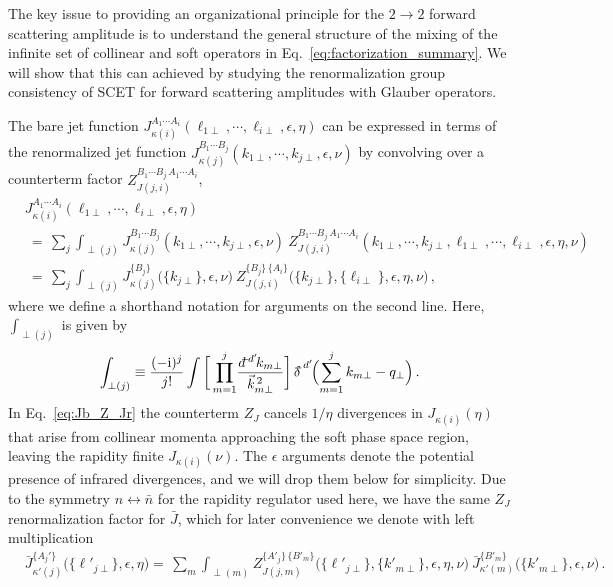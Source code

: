 \documentclass[letterpaper,11pt]{article}
\newcommand{\eq}[1]{Eq.~\eqref{eq:#1}}
\newcommand{\img}{\mathrm{i}}
\newcommand{\ddslash}{{d\!\!{}^-}}
\newcommand{\deltaslash}{{\delta\!\!\!{}^-}}
\newcommand{\nn}{\nonumber}
\newcommand{\bn}{{\bar n}}
\begin{document}
The key issue to providing an organizational principle for the  $2\to 2$ forward scattering amplitude is to understand the general structure of the mixing of the infinite set of collinear and soft operators in \eq{factorization_summary}. We will show that this can achieved by studying the renormalization group consistency of SCET for forward scattering amplitudes with Glauber operators.

The bare jet function $J_{\kappa(i)}^{A_1 \cdots A_i}(\ell_{1\perp}, \cdots, \ell_{i\perp},\epsilon,\eta)$ can be expressed in terms of the renormalized jet function $J_{\kappa(j)}^{B_1 \cdots B_j}(k_{1\perp},\cdots,k_{j\perp},\epsilon,\nu)$ by convolving over a counterterm factor  $Z_{J(j,i)}^{B_1\cdots B_j\, A_1\cdots A_i}$,
\begin{align}\label{eq:Jb_Z_Jr}
  & J_{\kappa(i)}^{A_1 \cdots A_i}(\ell_{1\perp}, \cdots, \ell_{i\perp},\epsilon,\eta)
  \\
   &\ =\, \sum_j \int_{\perp(j)}
  J_{\kappa(j)}^{B_1 \cdots B_j}(k_{1\perp},\cdots, k_{j\perp},\epsilon,\nu) \:
  Z_{J(j,i)}^{B_1\cdots B_j\, A_1\cdots A_i} ( k_{1\perp},\cdots, k_{j\perp},\ell_{1\perp},\cdots,\ell_{i\perp},\epsilon,\eta,\nu) 
 \nn\\
 &\ =\, \sum_j \int_{\perp(j)}
  J_{\kappa(j)}^{\{B_j\}}\bigl(\{k_{j\perp}\},\epsilon,\nu\bigr) \:
  Z_{J(j,i)}^{\{B_j\}\, \{A_i\}} \bigl( \{k_{j\perp}\},\{\ell_{i\perp}\},\epsilon,\eta,\nu\bigr) 
  \,, \nn
\end{align}
where we define a shorthand notation for arguments on the second line. Here, $\int_{\perp(j)}$ is given by
\begin{align}\label{eq:int_perp}
  \int_{\perp(j)} \equiv 
  \frac{(-\img)^{j}}{j!}  \int\bigg[  \prod_{m=1}^{j}\! \frac{\ddslash\!^{d'}\!k_{m\perp}}{\vec k_{m\perp}^{\,2}} \bigg]\, \deltaslash^{d'}  \!\Bigl(\sum_{m=1}^j k_{m\perp}- q_\perp\Bigr) 
 \,.
\end{align}
In \eq{Jb_Z_Jr} the counterterm $Z_J$ cancels $1/\eta$ divergences in $J_{\kappa (i)}(\eta)$ that arise from collinear momenta approaching the soft phase space region, leaving the rapidity finite $J_{\kappa (i)}(\nu)$. The $\epsilon$ arguments denote the potential presence of infrared divergences, and we will drop them below for simplicity.  Due to the symmetry $n\leftrightarrow \bn$ for the rapidity regulator used here, we have the same $Z_J$ renormalization factor for $\bar J$, which for later convenience we denote with left multiplication
\begin{align} \label{eq:Jbb_Z_Jbr}
  & \bar J_{\kappa'(j)}^{\{A_j'\}}\bigl(\{\ell'_{j\perp}\},\epsilon,\eta\bigr)
 =\, \sum_m \int_{\perp(m)}
  Z_{J(j,m)}^{\{A'_j\}\, \{B'_m\}} \bigl( \{\ell'_{j\perp}\},\{k'_{m\perp}\},\epsilon,\eta,\nu\bigr) \:
  \bar J_{\kappa'(m)}^{\{B'_m\}}\bigl(\{k'_{m\perp}\},\epsilon,\nu\bigr)  
 \,.
\end{align}
\end{document}
